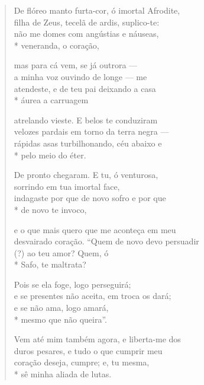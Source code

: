 \begin{verse}
De flóreo manto furta-cor, ó imortal Afrodite,\\
filha de Zeus, tecelã de ardis, suplico-te:\\
não me domes com angústias e náuseas,\\*
veneranda, o coração,

mas para cá vem, se já outrora ---\\
a minha voz ouvindo de longe --- me\\
atendeste, e de teu pai deixando a casa\\*
áurea a carruagem

atrelando vieste. E belos te conduziram\\
velozes pardais em torno da terra negra ---\\
rápidas asas turbilhonando, céu abaixo e\\*
pelo meio do éter.

De pronto chegaram. E tu, ó venturosa,\\
sorrindo em tua imortal face,\\
indagaste por que de novo sofro e por que\\*
de novo te invoco,

e o que mais quero que me aconteça em meu\\
desvairado coração. “Quem de novo devo persuadir\\
(?) ao teu amor? Quem, ó\\*
Safo, te maltrata?

Pois se ela foge, logo perseguirá;\\
e se presentes não aceita, em troca os dará;\\
e se não ama, logo amará,\\*
mesmo que não queira”.

Vem até mim também agora, e liberta-me dos\\
duros pesares, e tudo o que cumprir meu\\
coração deseja, cumpre; e, tu mesma,\\*
sê minha aliada de lutas.
\end{verse}

